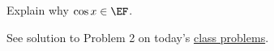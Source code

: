 \documentclass[handout]{mcs}
\begin{document}

\begin{problem}[0.5pts]
Explain why $\cos x \in \EF$.

\begin{solution}
See solution to Problem 2 on today's
\href{http://courses.csail.mit.edu/6.042/spring12/cp4w.pdf}{class
  problems}.

\end{solution}

\end{problem}
\end{document}
